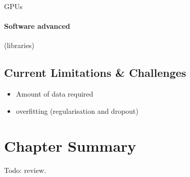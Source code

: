 GPUs

\paragraph{Software advanced}

(libraries)

\subsection{Current Limitations \& Challenges}

\begin{itemize}
    \item Amount of data required
    \item overfitting (regularisation and dropout)
\end{itemize}


\section{Chapter Summary}

Todo: review.
